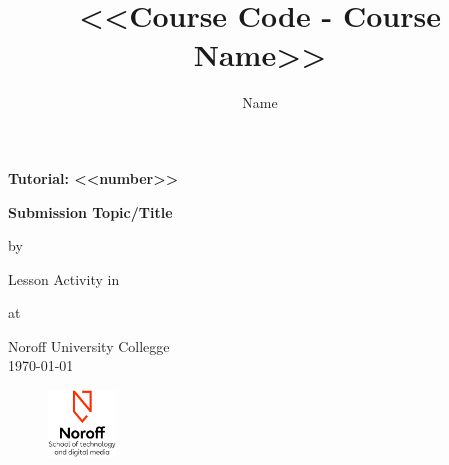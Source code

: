 \begin{titlepage}

  \begin{center}

    {\bfseries{\Large{Tutorial: <<number>>}}}
    
    {\bfseries{\LARGE{Submission Topic/Title}}}


      {\Large{by}}

    \begin{author}
      \author{\Large{Name}}
    \end{author}


    \vspace*{2.5cm}
    Lesson Activity in


    \begin{title}
        \title{\bfseries{\Huge{<<Course Code - Course Name>>}}}
    \end{title}

    \vspace*{2.5cm}
    at


    \Large{Noroff University Collegge\\
    \today}

    \vfill


    \begin{figure}[h!]
      \centering
      \includegraphics[height=50pt]{Noroff-Logo.png}
    \end{figure}


  \end{center}
\end{titlepage}
